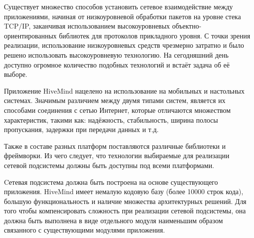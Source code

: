 Существует множество способов установить сетевое взаимодействие между
приложениями, начиная от низкоуровневой обработки пакетов на уровне стека
TCP/IP, заканчивая использованием высокоуровневых объектно-ориентированных
библиотек для протоколов прикладного уровня. С точки зрения реализации,
использование низкоуровневых средств чрезмерно затратно и было решено
использовать высокоуровневую технологию. На сегодняшний день доступно огромное
количество подобных технологий и встаёт задача об её выборе.

Приложение HiveMind нацелено на использование на мобильных и настольных
системах. Значимым различием между двумя типами систем, является их способами
соединения с сетью Интернет, которые отличаются множеством характеристик, такими
как: надёжность, стабильность, ширина полосы пропускания, задержки при передачи
данных и т.д.

Также в составе разных платформ поставляются различные библиотеки и фреймворки.
Из чего следует, что технологии выбираемые для реализации сетевой подсистемы
должны быть доступны под всеми платформами.

Cетевая подсистема должна быть построена на основе существующего приложения.
HiveMind имеет немалую кодовую базу (более 10000 строк кода), большую
функциональность и наличие множества архитектурных решений. Для того чтобы
компенсировать сложность при реализации сетевой подсистемы, она должна быть
выполнена в виде отдельного модуля наименьшим образом связанного с существующими
модулями приложения.


